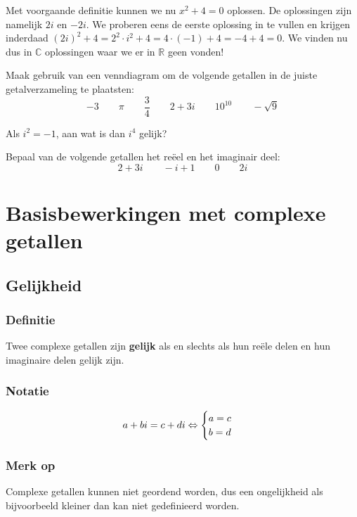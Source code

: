 \documentclass[12pt,twoside,a4]{article}
\begin{document}
Met voorgaande definitie kunnen we nu $x^2+4=0$ oplossen. De oplossingen zijn namelijk $2i$ en $-2i$. We proberen eens de eerste oplossing in te vullen en krijgen inderdaad $(2i)^2+4 = 2^2\cdot i^2 + 4 = 4\cdot(-1) + 4 = -4 + 4 = 0$. We vinden nu dus in $\mathbb{C}$ oplossingen waar we er in $\mathbb{R}$ geen vonden!

\begin{oefening}
  Maak gebruik van een venndiagram om de volgende getallen in de juiste getalverzameling te plaatsten:
  $$-3\qquad\pi\qquad\dfrac{3}{4}\qquad2+3i\qquad10^{10}\qquad-\sqrt{9}$$
\end{oefening}

\begin{oefening}
  Als $i^2=-1$, aan wat is dan $i^4$ gelijk?
\end{oefening}

\begin{oefening}
  Bepaal van de volgende getallen het reëel en het imaginair deel:
  $$2+3i\qquad -i+1\qquad 0 \qquad 2i$$
\end{oefening}

\pagebreak
\section{Basisbewerkingen met complexe getallen}

\subsection{Gelijkheid}

\subsubsection*{Definitie}
\begin{mdframed}
Twee complexe getallen zijn {\bf gelijk} als en slechts als hun reële delen en hun imaginaire delen gelijk zijn.
\end{mdframed}

\subsubsection*{Notatie}
$$a+bi = c+di \Leftrightarrow \begin{cases}a=c \\ b=d\end{cases}$$

\subsubsection*{Merk op}
Complexe getallen kunnen niet geordend worden, dus een ongelijkheid als bijvoorbeeld kleiner dan kan niet gedefinieerd worden.
\end{document}
